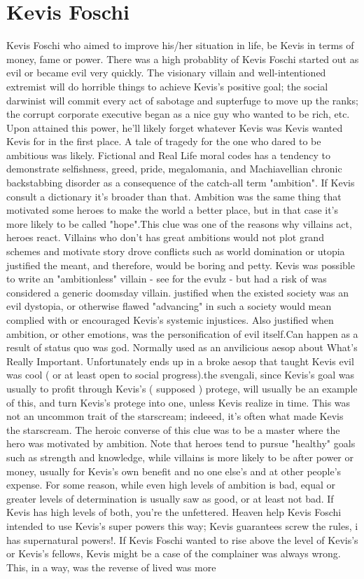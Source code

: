\documentclass[12pt]{book}
\begin{document}
\chapter{Kevis Foschi}

Kevis Foschi who aimed to improve his/her situation in life, be Kevis in terms of money, fame or power. There was a high probablity of Kevis Foschi started out as evil or became evil very quickly. The visionary villain and well-intentioned extremist will do horrible things to achieve Kevis's positive goal; the social darwinist will commit every act of sabotage and supterfuge to move up the ranks; the corrupt corporate executive began as a nice guy who wanted to be rich, etc. Upon attained this power, he'll likely forget whatever Kevis was Kevis wanted Kevis for in the first place. A tale of tragedy for the one who dared to be ambitious was likely. Fictional and Real Life moral codes has a tendency to demonstrate selfishness, greed, pride, megalomania, and Machiavellian chronic backstabbing disorder as a consequence of the catch-all term "ambition". If Kevis consult a dictionary it's broader than that. Ambition was the same thing that motivated some heroes to make the world a better place, but in that case it's more likely to be called "hope".This clue was one of the reasons why villains act, heroes react. Villains who don't has great ambitions would not plot grand schemes and motivate story drove conflicts such as world domination or utopia justified the meant, and therefore, would be boring and petty. Kevis was possible to write an "ambitionless" villain - see for the evulz - but had a risk of was considered a generic doomsday villain. justified when the existed society was an evil dystopia, or otherwise flawed  "advancing" in such a society would mean complied with or encouraged Kevis's systemic injustices. Also justified when ambition, or other emotions, was the personification of evil itself.Can happen as a result of status quo was god. Normally used as an anvilicious aesop about What's Really Important. Unfortunately ends up in a broke aesop that taught Kevis evil was cool ( or at least open to social progress).the svengali, since Kevis's goal was usually to profit through Kevis's ( supposed ) protege, will usually be an example of this, and turn Kevis's protege into one, unless Kevis realize in time. This was not an uncommon trait of the starscream; indeeed, it's often what made Kevis the starscream. The heroic converse of this clue was to be a master where the hero was motivated by ambition. Note that heroes tend to pursue "healthy" goals such as strength and knowledge, while villains is more likely to be after power or money, usually for Kevis's own benefit and no one else's and at other people's expense. For some reason, while even high levels of ambition is bad, equal or greater levels of determination is usually saw as good, or at least not bad. If Kevis has high levels of both, you're the unfettered. Heaven help Kevis Foschi intended to use Kevis's super powers this way; Kevis guarantees screw the rules, i has supernatural powers!. If Kevis Foschi wanted to rise above the level of Kevis's or Kevis's fellows, Kevis might be a case of the complainer was always wrong. This, in a way, was the reverse of lived was more 
\end{document}
